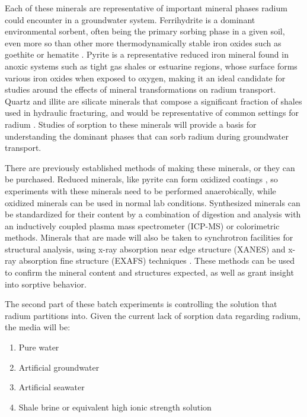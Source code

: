 \documentclass[twoside,12pt,titlepage]{article}
\begin{document}
\par Each of these minerals are representative of important mineral phases radium could encounter in a groundwater system. Ferrihydrite is a dominant environmental sorbent, often being the primary sorbing phase in a given soil, even more so than other more thermodynamically stable iron oxides such as goethite or hematite \cite{Michel2007}. Pyrite is a representative reduced iron mineral found in anoxic systems such as tight gas shales or estuarine regions, whose surface forms various iron oxides when exposed to oxygen, making it an ideal candidate for studies around the effects of mineral transformations on radium transport. Quartz and illite are silicate minerals that compose a significant fraction of shales used in hydraulic fracturing, and would be representative of common settings for radium \cite{Chermak2014}. Studies of sorption to these minerals will provide a basis for understanding the dominant phases that can sorb radium during groundwater transport.
\par There are previously established methods of making these minerals, or they can be purchased. Reduced minerals, like pyrite can form oxidized coatings \cite{Buckley1987}, so experiments with these minerals need to be performed anaerobically, while oxidized minerals can be used in normal lab conditions. Synthesized minerals can be standardized for their content by a combination of digestion and analysis with an inductively coupled plasma mass spectrometer (ICP-MS) or colorimetric methods. Minerals that are made will also be taken to synchrotron facilities for structural analysis, using x-ray absorption near edge structure (XANES) and x-ray absorption fine structure (EXAFS) techniques \cite{Fendorf1999}. These methods can be used to confirm the mineral content and structures expected, as well as grant insight into sorptive behavior.
\par The second part of these batch experiments is controlling the solution that radium partitions into. Given the current lack of sorption data regarding radium, the media will be:

\begin{enumerate}[label = \roman*)]
	\item Pure water
	\item Artificial groundwater
	\item Artificial seawater
	\item Shale brine or equivalent high ionic strength solution
\end{enumerate}
\end{document}
